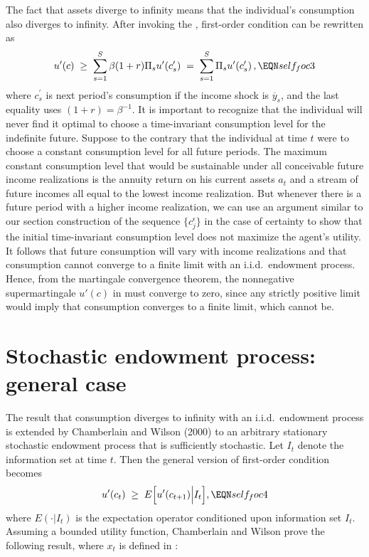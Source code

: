 The fact that assets diverge to infinity means that the individual's
consumption also diverges to infinity. After invoking the
, first-order condition 
can be rewritten as
$$
u'(c) \;\geq\; \sum_{s=1}^S \beta (1+r) \Pi_s u'(c^\prime_s)
      \;=\; \sum_{s=1}^S  \Pi_s u'(c^\prime_s)\,,           \EQN self_foc3
$$
where $c^\prime_s$ is next period's consumption if the income
shock is $\overline y_s$, and the last equality uses $(1+r)=\beta^{-1}$.
It is important to recognize that the individual will never find
it optimal to choose a time-invariant consumption level for the
indefinite future. Suppose to the contrary that the individual
at time $t$ were to choose a constant consumption level for all
future periods. The maximum constant consumption level that would
be sustainable under all conceivable future income realizations
is the annuity return on  his current assets $a_t$ and a stream of
future incomes all equal to the lowest income realization. But
whenever there is a future period with a higher income realization,
we can use an argument similar to our section  construction of the sequence
$\{c^\epsilon_j\}$ in the case of certainty to show that
the initial time-invariant consumption level does not maximize
the agent's utility. It follows that future consumption
will vary with income realizations and  that consumption cannot
converge to a finite limit with an i.i.d.\ endowment process.
Hence, from  the martingale convergence
theorem, the nonnegative supermartingale $u'(c)$ in 
must converge to zero, since any strictly positive limit would
imply that consumption
converges to a finite limit, which cannot be.




\section{Stochastic endowment process: general case}

The result that consumption diverges to infinity with an i.i.d.\
endowment process is extended by
Chamberlain and Wilson (2000) to an arbitrary stationary
stochastic endowment
process that is sufficiently stochastic. Let $I_t$ denote the information
set at time $t$. Then the general version of first-order condition
\Ep{self_foc3} becomes
\offparens
$$
u'(c_t) \;\geq\; E\Bigl[u'(c_{t+1}) \Big| I_t\Bigr],           \EQN self_foc4
$$
\autoparens
where $E(\cdot|I_t)$ is the expectation operator conditioned upon
information set $I_t$. Assuming a bounded utility function,
Chamberlain and Wilson prove the following result, where $x_t$ is defined
in \Ep{self_x}:

